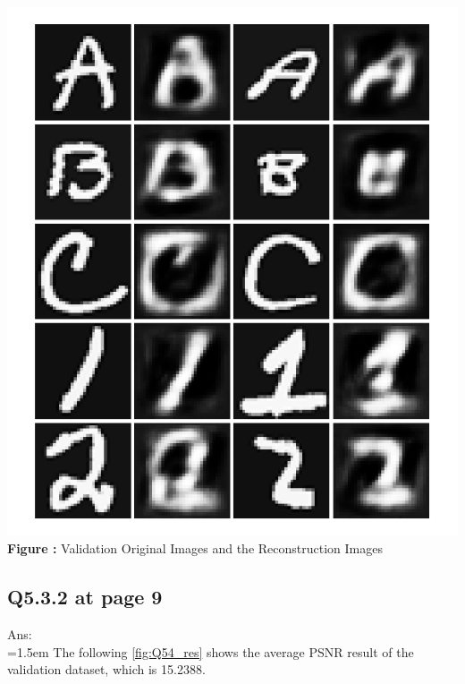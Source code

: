 \documentclass{article}
\begin{document}
\begin{minipage}{1\linewidth}
	\centering
	\hspace{0.12\linewidth} 
	\includegraphics[width=0.8\linewidth]{./Q53_res.png}  %
	\newline
	\textbf{Figure \thefigure:} Validation Original Images and the Reconstruction Images %
	\label{fig:Q53_res}  %
\end{minipage}	
	
	\newpage	
	\subsection*{Q5.3.2 at page 9\texttt{}}
	Ans:\\
	\hangindent=1.5em \hspace{1.5em}The following \autoref{fig:Q54_res} shows the average PSNR result of the validation dataset, which is 15.2388. 
	\newline
\end{document}
